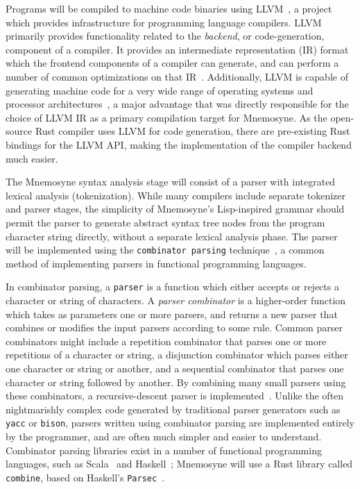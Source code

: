 \documentclass[11pt,a4paper]{article}
\theoremstyle{break}
\begin{document}
Programs will be compiled to machine code binaries using LLVM~\cite{Lattner:2004:LCF:977395.977673}, a project which provides infrastructure for programming language compilers. LLVM primarily provides functionality related to the \textit{backend}, or code-generation, component of a compiler. It provides an intermediate representation (IR) format which the frontend components of a compiler can generate, and can perform a number of common optimizations on that IR~\cite{Lattner:2004:LCF:977395.977673,Terei:2010:LBG:1863523.1863538}. Additionally, LLVM is capable of generating machine code for a very wide range of operating systems and processor architectures~\cite{Lattner:2004:LCF:977395.977673,Terei:2010:LBG:1863523.1863538}, a major advantage that was directly responsible for the choice of LLVM IR as a primary compilation target for Mnemosyne. As the open-source Rust compiler uses LLVM for code generation, there are pre-existing Rust bindings for the LLVM API, making the implementation of the compiler backend much easier.

The Mnemosyne syntax analysis stage will consist of a parser with integrated lexical analysis (tokenization). While many compilers include separate tokenizer and parser stages, the simplicity of Mnemosyne's Lisp-inspired grammar should permit the parser to generate abstract syntax tree nodes from the program character string directly, without a separate lexical analysis phase. The parser will be implemented using the \texttt{combinator parsing} technique~\cite{swierstra2001combinator,frost2008parser,fokker1995functional,hutton1996monadic}, a common method of implementing parsers in functional programming languages.

In combinator parsing, a \texttt{parser} is a function which either accepts or rejects a character or string of characters. A \textit{parser combinator} is a higher-order function which takes as parameters one or more parsers, and returns a new parser that combines or modifies the input parsers according to some rule.  Common parser combinators might include a repetition combinator that parses one or more repetitions of a character or string, a disjunction combinator which parses either one character or string or another, and a sequential combinator that parses one character or string followed by another. By combining many small parsers using these combinators, a recursive-descent parser is implemented~\cite{Danielsson:2010:TPC:1932681.1863585,swierstra2001combinator,hutton1996monadic}. Unlike the often nightmarishly complex code generated by traditional parser generators such as \texttt{yacc} or \texttt{bison}, parsers written using combinator parsing are implemented entirely by the programmer, and are often much simpler and easier to understand. Combinator parsing libraries exist in a number of functional programming languages, such as Scala~\cite{moors2008parser} and Haskell~\cite{leijen2002parsec}; Mnemosyne will use a Rust library called \texttt{combine}, based on Haskell's \texttt{Parsec}~\cite{leijen2002parsec}.
\end{document}
